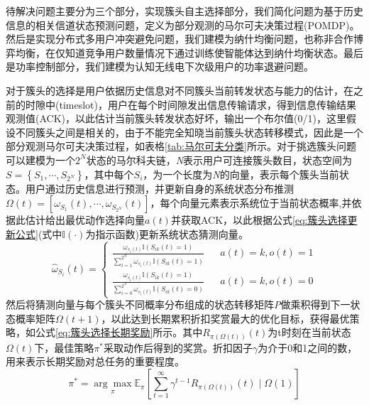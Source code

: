 待解决问题主要分为三个部分，实现簇头自主选择部分，我们简化问题为基于历史信息的相关信道状态预测问题，定义为部分观测的马尔可夫决策过程(POMDP)。然后是实现分布式多用户冲突避免问题，我们建模为纳什均衡问题，也称非合作博弈均衡，在仅知道竞争用户数量情况下通过训练使智能体达到纳什均衡状态。最后是功率控制部分，我们建模为认知无线电下次级用户的功率退避问题。

对于簇头的选择是用户依据历史信息对不同簇头当前转发状态与能力的估计，在之前的时隙中(timeslot)，用户在每个时间隙发出信息传输请求，得到信息传输结果观测值(ACK)，以此估计当前簇头转发状态好坏，输出一个布尔值(0/1)，这里假设不同簇头之间是相关的，由于不能完全知晓当前簇头状态转移模式，因此是一个部分观测马尔可夫决策过程，如表格\ref{tab:马尔可夫分类}所示。对于挑选簇头问题可以建模为一个$2^{N}$状态的马尔科夫链，\textit{N}表示用户可连接簇头数目，状态空间为$S=\left\{S_{1},\cdots,S_{2^{N}}\right\}$，其中每个$S_{i}$，为一个长度为\textit{N}的向量，表示每个簇头当前状态。用户通过历史信息进行预测，并更新自身的系统状态分布推测$\Omega \left ( t \right )=\left [ \omega _{S_{1}} \left ( t \right ),\cdots,\omega _{S_{2^{N}}} \left ( t \right )\right ]$，每个向量元素表示系统位于当前状态概率,并依据此估计给出最优动作选择向量$a(t)$并获取ACK，以此根据公式\ref{eq:簇头选择更新公式}(式中$\mathbb{I}\left(\cdot\right)$为指示函数)更新系统状态猜测向量\cite{8303773}。
\begin{equation}\label{eq:簇头选择更新公式}
\hat{\omega }_{S_{i}}\left ( t \right )=\left\{
\begin{aligned}
\frac{\omega _{s_{i}\left ( t \right )}\mathbb{I}\left ( S_{ik}\left ( t \right ) =1\right )}{\sum_{i=1}^{2^{N}}\omega _{s_{i}\left ( t \right )}\mathbb{I}\left ( S_{ik}\left ( t \right ) =1\right )}& & a(t)=k,o(t)=1\\
\frac{\omega _{s_{i}\left ( t \right )}\mathbb{I}\left ( S_{ik}\left ( t \right ) =1\right )}{\sum_{i=0}^{2^{N}}\omega _{s_{i}\left ( t \right )}\mathbb{I}\left ( S_{ik}\left ( t \right ) =0\right )}& & a(t)=k,o(t)=0
\end{aligned}
\right.
\end{equation}
然后将猜测向量与每个簇头不同概率分布组成的状态转移矩阵\textit{P}做乘积得到下一状态概率矩阵$\Omega \left ( t+1 \right )$，以此达到长期累积折扣奖赏最大的优化目标，获得最优策略，如公式\ref{eq:簇头选择长期奖励}所示。其中$R_{\pi\left ( \Omega \left ( t \right ) \right )}\left ( t \right )$为t时刻在当前状态$\Omega \left ( t \right ) $下，最佳策略$\pi^{*}$采取动作后得到的奖赏。折扣因子$\gamma$为介于0和1之间的数，用来表示长期奖励对总任务的重要程度。
\begin{equation}\label{eq:簇头选择长期奖励}
\pi ^{*}= \underset{\pi }{\arg \max}\mathbb{E}_{\pi}\left [ \sum_{t=1}^{\infty }\gamma ^{t-1} R_{\pi\left ( \Omega \left ( t \right ) \right )}\left ( t \right )\mid \Omega \left ( 1 \right )\right ]
\end{equation}
